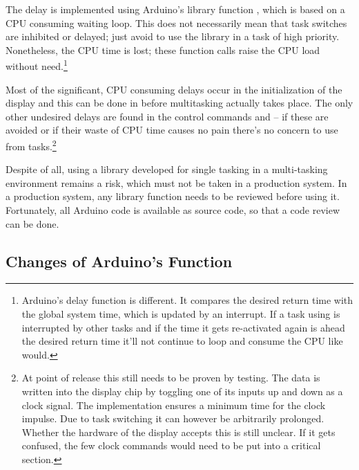 The delay is implemented using Arduino's library function
, which is based on a CPU consuming waiting loop.
This does not necessarily mean that task switches are inhibited or
delayed; just avoid to use the library in a task of high priority.
Nonetheless, the CPU time is lost; these function calls raise the CPU load
without need.\footnote{Arduino's delay function 
is different. It compares the desired return time with the
global system time, which is updated by an interrupt. If a task using
 is interrupted by other tasks and if the time it gets
re-activated again is ahead the desired return time it'll not continue to
loop and consume the CPU like  would.}

Most of the significant, CPU consuming delays occur in the initialization
of the display and this can be done in  before multitasking
actually takes place. The only other undesired delays are found in the
control commands  and  -- if these are avoided or
if their waste of CPU time causes no pain there's no concern to use
 from \rtos{} tasks.\footnote{At point of release
this still needs to be proven by testing. The data is written into the
display chip by toggling one of its inputs up and down as a clock signal.
The implementation ensures a minimum time for the clock impulse. Due to
task switching it can however be arbitrarily prolonged. Whether the
hardware of the display accepts this is still unclear. If it gets
confused, the few clock commands would need to be put into a critical
section.}

Despite of all, using a library developed for single tasking in a
multi-tasking environment remains a risk, which must not be taken in a
production system. In a production system, any library function needs to
be reviewed before using it. Fortunately, all Arduino code is available as
source code, so that a code review can be done.



\subsection{Changes of Arduino's  Function}

